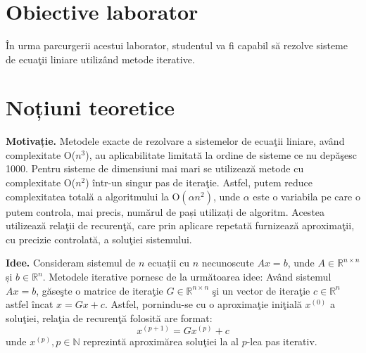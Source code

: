 \documentclass{exam}
\title{
	\textmd{\textbf{\MNLabTitle}}
}
\theoremstyle{definition}
\begin{document}
\begin{coverpages}

	\maketitle
	\tableofcontents

\end{coverpages}

\section{Obiective laborator}

\par \^{I}n urma parcurgerii acestui laborator, studentul va fi capabil s\u{a} rezolve sisteme de ecua\c{t}ii liniare utiliz\^{a}nd metode iterative.

\section{Noțiuni teoretice}

\par \textbf{Motivație.} Metodele exacte de rezolvare a sistemelor de ecua\c{t}ii liniare, av\^{a}nd complexitate O(${n}^{3}$), au aplicabilitate limitat\u{a} la ordine de sisteme ce nu dep\u{a}\c{s}esc 1000. Pentru sisteme de dimensiuni mai mari se utilizeaz\u{a} metode cu complexitate O(${n}^{2}$) \^{i}ntr-un singur pas de itera\c{t}ie. Astfel, putem reduce complexitatea totală a algoritmului la O\((\alpha{n}^{2})\), unde \(\alpha\) este o variabila pe care o putem controla, mai precis, numărul de pași utilizați de algoritm. Acestea utilizeaz\u{a} rela\c{t}ii de recuren\c{t}\u{a}, care prin aplicare repetat\u{a} furnizeaz\u{a} aproxima\c{t}ii, cu precizie controlat\u{a}, a solu\c{t}iei sistemului.

\par \textbf{Idee.} Consideram sistemul de $n$ ecuații cu $n$ necunoscute $Ax = b$, unde $A\in\mathbb{R}^{n \times n}$ și $b\in\mathbb{R}^{n}$. Metodele iterative pornesc de la următoarea idee: Av\^{a}nd sistemul $Ax = b$, g\u{a}se\c{s}te o matrice de itera\c{t}ie $G\in\mathbb{R}^{n \times n}$ \c{s}i un vector de itera\c{t}ie $c\in\mathbb{R}^{n}$ astfel \^{i}ncat $x = Gx + c$.  Astfel, pornindu-se cu o aproxima\c{t}ie ini\c{t}ial\u{a} ${x}^{(0)}$ a solu\c{t}iei, rela\c{t}ia de recuren\c{t}\u{a}  folosit\u{a} are format:
\begin{equation} \label{eq:1}
{x}^{(p+1)} = G{x}^{(p)} + c
\end{equation}
unde ${x}^{(p)}, p\in\mathbb{N}$ reprezint\u{a} aproxim\u{a}rea solu\c{t}iei la al $p$-lea pas iterativ.
\end{document}
